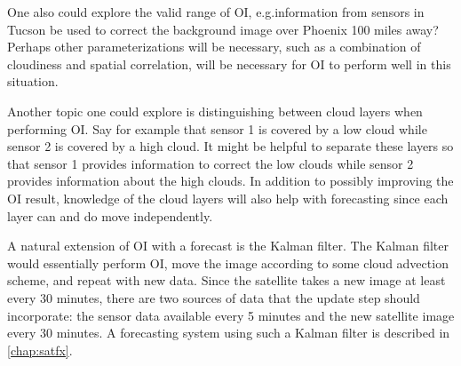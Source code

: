 One also could explore the valid range of OI, e.g.\@can information
from sensors in Tucson be used to correct the background image over
Phoenix 100 miles away?
Perhaps other parameterizations will be necessary, such as a
combination of cloudiness and spatial correlation, will be necessary
for OI to perform well in this situation.

Another topic one could explore is distinguishing between cloud layers
when performing OI.
Say for example that sensor 1 is covered by a low cloud while sensor 2
is covered by a high cloud.
It might be helpful to separate these layers so that sensor 1 provides
information to correct the low clouds while sensor 2 provides
information about the high clouds.
In addition to possibly improving the OI result, knowledge of the
cloud layers will also help with forecasting since each layer can and
do move independently.

A natural extension of OI with a forecast is the Kalman filter.
The Kalman filter would essentially perform OI, move the image
according to some cloud advection scheme, and repeat with new data.
Since the satellite takes a new image at least every 30 minutes, there
are two sources of data that the update step should incorporate: the
sensor data available every 5 minutes and the new satellite image
every 30 minutes.
A forecasting system using such a Kalman filter is described in
\cref{chap:satfx}.

